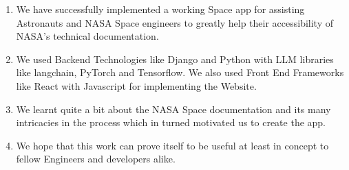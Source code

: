 \documentclass[11pt]{article}
\begin{document}
\begin{enumerate}
	\item We have successfully implemented a working Space app for assisting Astronauts and NASA Space engineers to greatly help their accessibility of NASA’s technical documentation.
	\item We used Backend Technologies like Django and Python with LLM libraries like langchain, PyTorch and Tensorflow. We also used Front End Frameworks like React with Javascript for implementing the Website.
	\item We learnt quite a bit about the NASA Space documentation and its many intricacies in the process which in turned motivated us to create the app.
	\item We hope that this work can prove itself to be useful at least in concept to fellow Engineers and developers alike.

\end{enumerate}

\clearpage
\end{document}

